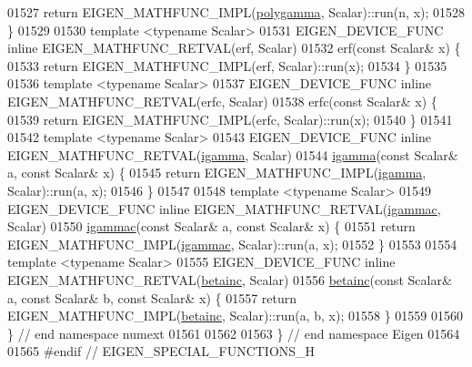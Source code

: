\begin{DoxyCode}
01527     \textcolor{keywordflow}{return} EIGEN\_MATHFUNC\_IMPL(\hyperlink{namespace_eigen_ae3b47a13a0699f5dbaa0623c11333dca}{polygamma}, Scalar)::run(n, x);
01528 \}
01529 
01530 \textcolor{keyword}{template} <\textcolor{keyword}{typename} Scalar>
01531 EIGEN\_DEVICE\_FUNC \textcolor{keyword}{inline} EIGEN\_MATHFUNC\_RETVAL(erf, Scalar)
01532     erf(\textcolor{keyword}{const} Scalar& x) \{
01533   \textcolor{keywordflow}{return} EIGEN\_MATHFUNC\_IMPL(erf, Scalar)::run(x);
01534 \}
01535 
01536 \textcolor{keyword}{template} <\textcolor{keyword}{typename} Scalar>
01537 EIGEN\_DEVICE\_FUNC \textcolor{keyword}{inline} EIGEN\_MATHFUNC\_RETVAL(erfc, Scalar)
01538     erfc(\textcolor{keyword}{const} Scalar& x) \{
01539   \textcolor{keywordflow}{return} EIGEN\_MATHFUNC\_IMPL(erfc, Scalar)::run(x);
01540 \}
01541 
01542 \textcolor{keyword}{template} <\textcolor{keyword}{typename} Scalar>
01543 EIGEN\_DEVICE\_FUNC \textcolor{keyword}{inline} EIGEN\_MATHFUNC\_RETVAL(\hyperlink{namespace_eigen_af5aa651137636b1cdbd27de1cfe91148}{igamma}, Scalar)
01544     \hyperlink{namespace_eigen_af5aa651137636b1cdbd27de1cfe91148}{igamma}(\textcolor{keyword}{const} Scalar& a, \textcolor{keyword}{const} Scalar& x) \{
01545   \textcolor{keywordflow}{return} EIGEN\_MATHFUNC\_IMPL(\hyperlink{namespace_eigen_af5aa651137636b1cdbd27de1cfe91148}{igamma}, Scalar)::run(a, x);
01546 \}
01547 
01548 \textcolor{keyword}{template} <\textcolor{keyword}{typename} Scalar>
01549 EIGEN\_DEVICE\_FUNC \textcolor{keyword}{inline} EIGEN\_MATHFUNC\_RETVAL(\hyperlink{namespace_eigen_a1abaa2ff8c7b1871eaf026a47c6bbf3b}{igammac}, Scalar)
01550     \hyperlink{namespace_eigen_a1abaa2ff8c7b1871eaf026a47c6bbf3b}{igammac}(\textcolor{keyword}{const} Scalar& a, \textcolor{keyword}{const} Scalar& x) \{
01551   \textcolor{keywordflow}{return} EIGEN\_MATHFUNC\_IMPL(\hyperlink{namespace_eigen_a1abaa2ff8c7b1871eaf026a47c6bbf3b}{igammac}, Scalar)::run(a, x);
01552 \}
01553 
01554 \textcolor{keyword}{template} <\textcolor{keyword}{typename} Scalar>
01555 EIGEN\_DEVICE\_FUNC \textcolor{keyword}{inline} EIGEN\_MATHFUNC\_RETVAL(\hyperlink{namespace_eigen_a726eae91d4e91d8e25cbe55fffa6a92f}{betainc}, Scalar)
01556     \hyperlink{namespace_eigen_a726eae91d4e91d8e25cbe55fffa6a92f}{betainc}(\textcolor{keyword}{const} Scalar& a, \textcolor{keyword}{const} Scalar& b, \textcolor{keyword}{const} Scalar& x) \{
01557   \textcolor{keywordflow}{return} EIGEN\_MATHFUNC\_IMPL(\hyperlink{namespace_eigen_a726eae91d4e91d8e25cbe55fffa6a92f}{betainc}, Scalar)::run(a, b, x);
01558 \}
01559 
01560 \}  \textcolor{comment}{// end namespace numext}
01561 
01562 
01563 \}  \textcolor{comment}{// end namespace Eigen}
01564 
01565 \textcolor{preprocessor}{#endif  // EIGEN\_SPECIAL\_FUNCTIONS\_H}
\end{DoxyCode}
